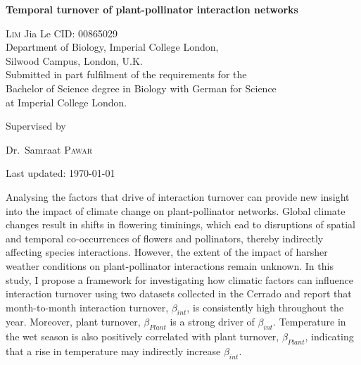 \documentclass[11pt]{article}
\renewenvironment{abstract}
 {\hspace{.8cm}
  {\bfseries\huge\abstractname}
  \list{}{
    \setlength{\leftmargin}{.95cm}%
    \setlength{\rightmargin}{\leftmargin}%
  }%
  \item\relax}
 {\endlist}
\begin{document}
\begin{titlepage}
	\centering
	\vspace*{\fill}
	{\huge\bfseries Temporal turnover of plant-pollinator interaction networks \par}
	\vspace{2cm}
	{\Large \textsc{Lim} Jia Le  {    }  CID: 00865029}
	\\ 	\vspace{0.5cm}
	{Department of Biology, Imperial College London, \\Silwood Campus, London, U.K.} \\ \vspace{0.5cm}
	{Submitted in part fulfilment of the requirements for the \\ Bachelor of Science degree in Biology with German for Science \\ at Imperial College London.} \\
	\vspace*{\fill}
	{\large Supervised by\par
	Dr.~Samraat \textsc{Pawar}}
	\vfill
	{\large Last updated: \today\par}
\end{titlepage}

\newpage
{}
\vspace*{\fill}
\begin{abstract}  
\doublespacing
Analysing the factors that drive of interaction turnover can provide new insight into the impact of climate change on plant-pollinator networks. Global climate changes result in shifts in flowering timinings, which ead to disruptions of spatial and temporal co-occurrences of flowers and pollinators, thereby indirectly affecting species interactions. However, the extent of the impact of harsher weather conditions on plant-pollinator interactions remain unknown. In this study, I propose a framework for investigating how climatic factors can influence interaction turnover using two datasets collected in the Cerrado and report that month-to-month interaction turnover, $\beta_{int}$, is consistently high throughout the year. Moreover, plant turnover, $\beta_{Plant}$ is a strong driver of $\beta_{int}$. Temperature in the wet season is also positively correlated with plant turnover, $\beta_{Plant}$, indicating that a rise in temperature may indirectly increase $\beta_{int}$. 

\end{abstract}
\vfill
\end{document}
